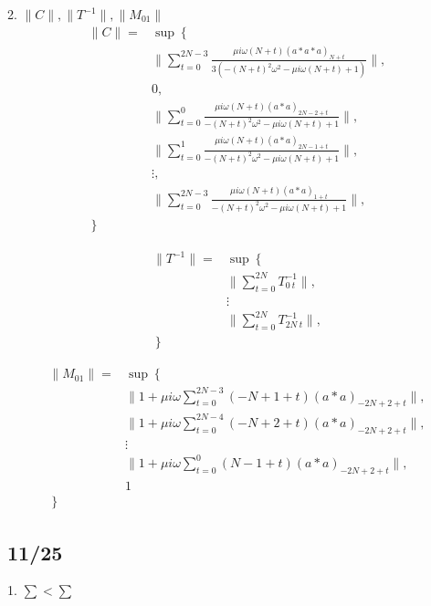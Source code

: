 \documentclass[11pt,a4paper,titlepage]{jsreport}
\theoremstyle{definition}
\begin{document}
2. $\|C\|, \|T^{-1}\|, \|M_{01}\|$
\begin{equation}
  \begin{split}
    \|C\| =& \sup \left\lbrace \right. \\
    & \| \sum_{t=0}^{2N-3} \frac{\mu i \omega (N+t) (a*a*a)_{N+t}}{3(-(N+t)^2 \omega^2 - \mu i \omega (N+t)+ 1)} \|,\\
    & 0,\\
    & \| \sum_{t=0}^{0} \frac{ \mu i \omega (N+t) (a*a)_{2N-2 + t}}{-(N+t)^2 \omega^2 - \mu i \omega (N+t)+ 1} \|,\\
    & \| \sum_{t=0}^{1} \frac{ \mu i \omega (N+t) (a*a)_{2N-1 + t} }{-(N+t)^2 \omega^2 - \mu i \omega (N+t)+ 1}\|,\\
    & \vdots , \\
    & \| \sum_{t=0}^{2N-3} \frac{ \mu i \omega (N+t) (a*a)_{1 + t} }{-(N+t)^2 \omega^2 - \mu i \omega (N+t)+ 1}\|,\\
    \left. \right\rbrace&
  \end{split}
\end{equation}


\begin{equation}
  \begin{split}
    \|T^{-1}\| =& \sup \left\lbrace \right. \\
    & \|\sum_{t=0}^{2N} T_{0\ t}^{-1}\|, \\
    & \vdots \\
    & \|\sum_{t=0}^{2N} T_{2N\ t}^{-1}\|, \\
    \left. \right\rbrace&
  \end{split}
\end{equation}

\begin{equation}
  \begin{split}
    \|M_{01}\| =& \sup \left\lbrace \right. \\
    &\| 1 + \mu i \omega \sum_{t=0}^{2N-3} (-N+1 + t) (a*a)_{-2N+2+t} \| , \\
    &\| 1 + \mu i \omega \sum_{t=0}^{2N-4} (-N+2 + t) (a*a)_{-2N+2+t} \| , \\
    & \vdots \\
    &\| 1 + \mu i \omega \sum_{t=0}^{0} (N-1 + t) (a*a)_{-2N+2+t} \| , \\
    & 1 \\
    \left. \right\rbrace&
  \end{split}
\end{equation}

\subsection*{11/25}
1. $\sum < \sum$
\end{document}
